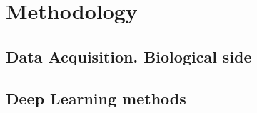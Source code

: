 \section{Methodology}
	\subsection{Data Acquisition. Biological side}
	\subsection{Deep Learning methods}